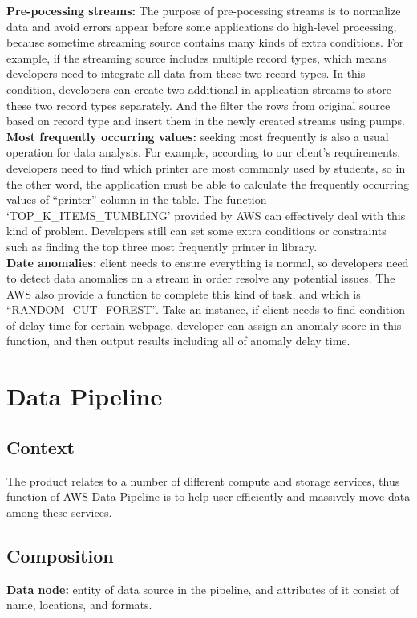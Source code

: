 	\noindent \textbf{Pre-pocessing streams:} The purpose of pre-pocessing streams is to normalize data and avoid errors appear before some applications do high-level processing, because sometime streaming source contains many kinds of extra conditions. For example, if the streaming source includes multiple record types, which means developers need to integrate all data from these two record types. In this condition, developers can create two additional in-application streams to store these two record types separately. And the filter the rows from original source based on record type and insert them in the newly created streams using pumps\cite{z4}.\\

	\noindent \textbf{Most frequently occurring values:} seeking most frequently is also a usual operation for data analysis. For example, according to our client’s requirements, developers need to find which printer are most commonly used by students, so in the other word, the application must be able to calculate the frequently occurring values of “printer” column in the table. The function ‘TOP\_K\_ITEMS\_TUMBLING’ provided by AWS can effectively deal with this kind of problem. Developers still can set some extra conditions or constraints such as finding the top three most frequently printer in library.\\

	\noindent \textbf{Date anomalies:} client needs to ensure everything is normal, so developers need to detect data anomalies on a stream in order resolve any potential issues. The AWS also provide a function to complete this kind of task, and which is “RANDOM\_CUT\_FOREST”. Take an instance, if client needs to find condition of delay time for certain webpage, developer can assign an anomaly score in this function, and then output results including all of anomaly delay time.
       
\section{Data Pipeline}
	\subsection{Context}
    The product relates to a number of different compute and storage services, thus function of AWS Data Pipeline is to help user efficiently and massively move data among these services.
     
     \subsection{Composition}
     \textbf{Data node:} entity of data source in the pipeline, and attributes of it consist of name, locations, and formats\cite{z5}. 
     
